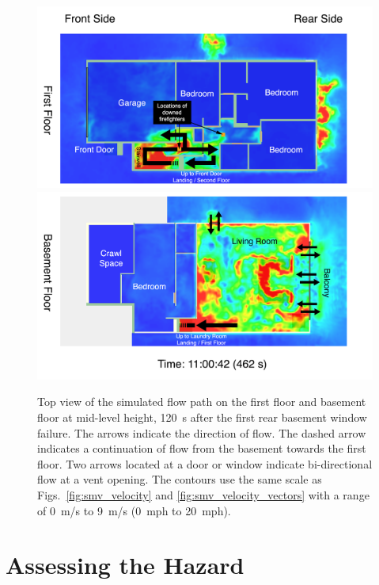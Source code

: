 \documentclass[12pt,oneside]{book}
\begin{document}
\begin{figure}[!ht]
\includegraphics[width=6.5in]{../Figures/Flow_Path_Top_Vel_462_s_First_Floor}
\includegraphics[width=6.5in]{../Figures/Flow_Path_Top_Vel_462_s_Basement_Floor}
\caption[Top view of the simulated flow path in the interior stairwell.]
{Top view of the simulated flow path on the first floor and basement floor at mid-level height, 120~s after the first rear basement window failure. The arrows indicate the direction of flow. The dashed arrow indicates a continuation of flow from the basement towards the first floor. Two arrows located at a door or window indicate bi-directional flow at a vent opening. The contours use the same scale as Figs.~\ref{fig:smv_velocity} and \ref{fig:smv_velocity_vectors} with a range of 0~m/s to 9~m/s (0~mph to 20~mph).}
\label{fig:flow_path_top}
\end{figure}


\clearpage


\section{Assessing the Hazard}
\label{sec:assessing_the_hazard}
\end{document}

